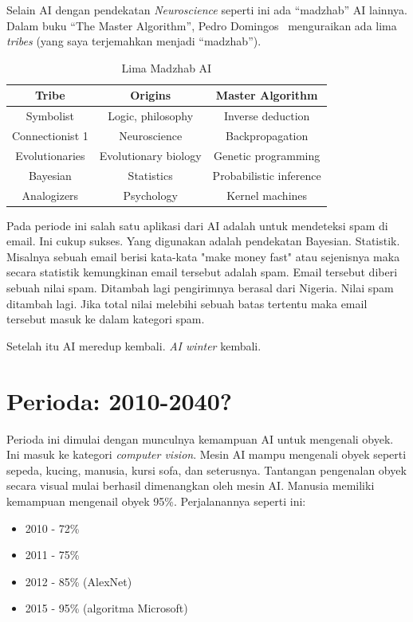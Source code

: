 Selain AI dengan pendekatan \emph{Neuroscience} seperti ini ada
``madzhab'' AI lainnya.
Dalam buku ``The Master Algorithm'', Pedro Domingos~\cite{domingos2015master}
menguraikan ada lima \emph{tribes} (yang saya terjemahkan menjadi ``madzhab'').

\begin{table}[htbp]
    \centering
    \caption{Lima Madzhab AI}
    \label{tab:madzhab}
    \begin{tabular}{ccc}
        \toprule
        \textbf{Tribe} & \textbf{Origins} & \textbf{Master Algorithm} \\
        \midrule
        Symbolist & Logic, philosophy & Inverse deduction \\
        Connectionist 1 & Neuroscience & Backpropagation \\
        Evolutionaries & Evolutionary biology & Genetic programming \\
        Bayesian & Statistics & Probabilistic inference \\
        Analogizers & Psychology & Kernel machines \\
        \bottomrule
    \end{tabular}
\end{table}

Pada periode ini salah satu aplikasi dari AI adalah untuk mendeteksi
spam di email. Ini cukup sukses. Yang digunakan adalah pendekatan Bayesian.
Statistik.
Misalnya sebuah email berisi kata-kata "make money fast" atau sejenisnya
maka secara statistik kemungkinan email tersebut adalah spam.
Email tersebut diberi sebuah nilai spam.
Ditambah lagi pengirimnya berasal dari Nigeria.
Nilai spam ditambah lagi. 
Jika total nilai melebihi sebuah batas tertentu maka email tersebut masuk
ke dalam kategori spam.

Setelah itu AI meredup kembali. \emph{AI winter} kembali.

\section{Perioda: 2010-2040?}
Perioda ini dimulai dengan munculnya kemampuan AI untuk mengenali obyek.
Ini masuk ke kategori \emph{computer vision}.
Mesin AI mampu mengenali obyek seperti sepeda, kucing, manusia, kursi sofa,
dan seterusnya.
Tantangan pengenalan obyek secara visual mulai berhasil dimenangkan oleh
mesin AI. Manusia memiliki kemampuan mengenail obyek 95\%.
Perjalanannya seperti ini:
\begin{itemize}
\item 2010 - 72\%
\item 2011 - 75\%
\item 2012 - 85\% (AlexNet)
\item 2015 - 95\% (algoritma Microsoft)
\end{itemize}

